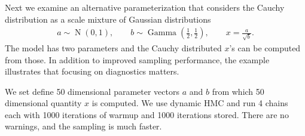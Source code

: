 \documentclass[american,]{article}
\DeclareMathOperator{\N}{N}
\DeclareMathOperator{\Gam}{Gamma}
\begin{document}
Next we examine an alternative parameterization that considers the
Cauchy distribution as a scale mixture of Gaussian distributions
\begin{align}
  a \sim  \N(0,1), \qquad
  b \sim  \Gam\left(\frac{1}{2},\frac{1}{2}\right), \qquad
  x =  \frac{a}{\sqrt{b}}.
\end{align}
The model has two parameters and the Cauchy distributed \(x\)'s can be
computed from those. In addition to improved sampling performance, the
example illustrates that focusing on diagnostics matters.

We set define 50 dimensional parameter vectors $a$ and $b$ from which
50 dimensional quantity $x$ is computed.
We use dynamic HMC and run 4 chains each with 1000 iterations of
warmup and 1000 iterations stored. There are no warnings, and the
sampling is much faster.







\end{document}
